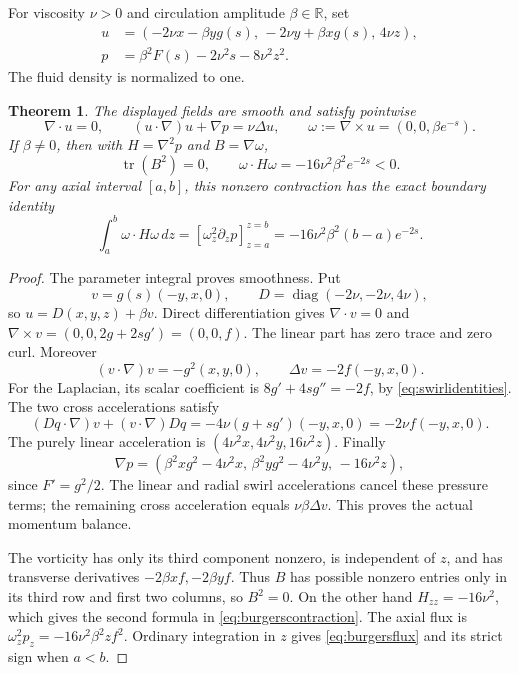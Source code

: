 \documentclass[11pt]{article}
\newtheorem{theorem}{Theorem}[section]
\begin{document}
For viscosity $\nu>0$ and circulation amplitude $\beta\in\mathbb R$,
set
\begin{align}
 u&=(-2\nu x-\beta yg(s),\,-2\nu y+\beta xg(s),\,4\nu z),
 \label{eq:burgersvelocity}\\
 p&=\beta^2F(s)-2\nu^2s-8\nu^2z^2.\label{eq:burgerspressure}
\end{align}
The fluid density is normalized to one.
\begin{theorem}\label{thm:burgersactual}
The displayed fields are smooth and satisfy pointwise
\[
 \nabla\cdot u=0,\qquad
 (u\cdot\nabla)u+\nabla p=\nu\Delta u,\qquad
 \omega:=\nabla\times u=(0,0,\beta e^{-s}).
\]
If $\beta\ne0$, then with $H=\nabla^2p$ and $B=\nabla\omega$,
\begin{equation}\label{eq:burgerscontraction}
 \operatorname{tr}(B^2)=0,\qquad
 \omega\cdot H\omega=-16\nu^2\beta^2e^{-2s}<0.
\end{equation}
For any axial interval $[a,b]$, this nonzero contraction has the exact
boundary identity
\begin{equation}\label{eq:burgersflux}
 \int_a^b\omega\cdot H\omega\,dz
 =[\omega_z^2\partial_zp]_{z=a}^{z=b}
 =-16\nu^2\beta^2(b-a)e^{-2s}.
\end{equation}
\end{theorem}
\begin{proof}
The parameter integral proves smoothness. Put
\[
 v=g(s)(-y,x,0),\qquad D=\operatorname{diag}(-2\nu,-2\nu,4\nu),
\]
so $u=D(x,y,z)+\beta v$. Direct differentiation gives
$\nabla\cdot v=0$ and
$\nabla\times v=(0,0,2g+2sg')=(0,0,f)$. The linear part has zero
trace and zero curl. Moreover
\[
 (v\cdot\nabla)v=-g^2(x,y,0),\qquad
 \Delta v=-2f(-y,x,0).
\]
For the Laplacian, its scalar coefficient is
$8g'+4sg''=-2f$, by \eqref{eq:swirlidentities}.
The two cross accelerations satisfy
\[
 (Dq\cdot\nabla)v+(v\cdot\nabla)Dq
 =-4\nu(g+sg')(-y,x,0)=-2\nu f(-y,x,0).
\]
The purely linear acceleration is
$(4\nu^2x,4\nu^2y,16\nu^2z)$. Finally
\[
 \nabla p=(\beta^2xg^2-4\nu^2x,\,
            \beta^2yg^2-4\nu^2y,\,-16\nu^2z),
\]
since $F'=g^2/2$. The linear and radial swirl accelerations cancel
these pressure terms; the remaining cross acceleration equals
$\nu\beta\Delta v$. This proves the actual momentum balance.

The vorticity has only its third component nonzero, is independent of
$z$, and has transverse derivatives $-2\beta xf,-2\beta yf$.
Thus $B$ has possible nonzero entries only in its third row and first
two columns, so $B^2=0$. On the other hand $H_{zz}=-16\nu^2$, which
gives the second formula in \eqref{eq:burgerscontraction}. The axial
flux is $\omega_z^2p_z=-16\nu^2\beta^2zf^2$. Ordinary integration
in $z$ gives \eqref{eq:burgersflux} and its strict sign when $a<b$.
\end{proof}
\end{document}
